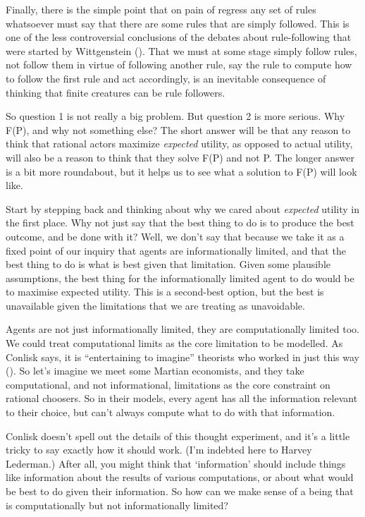 \documentclass[
  12pt,
  letterpaper,
]{scrbook}
\begin{document}
Finally, there is the simple point that on pain of regress any set of
rules whatsoever must say that there are some rules that are simply
followed. This is one of the less controversial conclusions of the
debates about rule-following that were started by Wittgenstein
(). That we must at some stage
simply follow rules, not follow them in virtue of following another
rule, say the rule to compute how to follow the first rule and act
accordingly, is an inevitable consequence of thinking that finite
creatures can be rule followers.

So question 1 is not really a big problem. But question 2 is more
serious. Why F(P), and why not something else? The short answer will be
that any reason to think that rational actors maximize \emph{expected}
utility, as opposed to actual utility, will also be a reason to think
that they solve F(P) and not P. The longer answer is a bit more
roundabout, but it helps us to see what a solution to F(P) will look
like.

Start by stepping back and thinking about why we cared about
\emph{expected} utility in the first place. Why not just say that the
best thing to do is to produce the best outcome, and be done with it?
Well, we don't say that because we take it as a fixed point of our
inquiry that agents are informationally limited, and that the best thing
to do is what is best given that limitation. Given some plausible
assumptions, the best thing for the informationally limited agent to do
would be to maximise expected utility. This is a second-best option, but
the best is unavailable given the limitations that we are treating as
unavoidable.

Agents are not just informationally limited, they are computationally
limited too. We could treat computational limits as the core limitation
to be modelled. As Conlisk says, it is ``entertaining to imagine''
theorists who worked in just this way
(). So let's imagine we
meet some Martian economists, and they take computational, and not
informational, limitations as the core constraint on rational choosers.
So in their models, every agent has all the information relevant to
their choice, but can't always compute what to do with that information.

Conlisk doesn't spell out the details of this thought experiment, and
it's a little tricky to say exactly how it should work. (I'm indebted
here to Harvey Lederman.) After all, you might think that `information'
should include things like information about the results of various
computations, or about what would be best to do given their information.
So how can we make sense of a being that is computationally but not
informationally limited?
\end{document}
